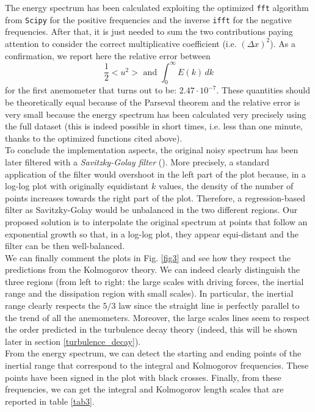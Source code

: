 \documentclass[11pt,titlepage]{article}
\begin{document}
The energy spectrum has been calculated exploiting the optimized \texttt{fft} algorithm from \texttt{Scipy} for the positive frequencies and the inverse \texttt{ifft} for the negative frequencies. After that, it is just needed to sum the two contributions paying attention to consider the correct multiplicative coefficient (i.e. $(\Delta x)^2$). As a confirmation, we report here the relative error between
\begin{equation*}
	\frac{1}{2}<u^2> \text{ and } \int_0^\infty E(k)\, dk
\end{equation*}
for the first anemometer that turns out to be: $2.47 \cdot 10^{-7}$. These quantities should be theoretically equal because of the Parseval theorem and the relative error is very small because the energy spectrum has been calculated very precisely using the full dataset (this is indeed possible in short times, i.e. less than one minute, thanks to the optimized functions cited above). \\
To conclude the implementation aspects, the original noisy spectrum has been later filtered with a \emph{Savitzky-Golay filter} (\cite{savgol}). More precisely, a standard application of the filter would overshoot in the left part of the plot because, in a log-log plot with originally equidistant $k$ values, the density of the number of points increases towards the right part of the plot. Therefore, a regression-based filter as Savitzky-Golay would be unbalanced in the two different regions. Our proposed solution is to interpolate the original spectrum at points that follow an exponential growth so that, in a log-log plot, they appear equi-distant and the filter can be then well-balanced. \\
We can finally comment the plots in Fig. \ref{fig3} and see how they respect the predictions from the Kolmogorov theory. We can indeed clearly distinguish the three regions (from left to right: the large scales with driving forces, the inertial range and the dissipation region with small scales). In particular, the inertial range clearly respects the $5/3$ law since the straight line is perfectly parallel to the trend of all the anemometers. Moreover, the large scales lines seem to respect the order predicted in the turbulence decay theory (indeed, this will be shown later in section \ref{turbulence_decay}). \\
From the energy spectrum, we can detect the starting and ending points of the inertial range that correspond to the integral and Kolmogorov frequencies. These points have been signed in the plot with black crosses. Finally, from these frequencies, we can get the integral and Kolmogorov length scales that are reported in table \ref{tab3}. \\
\end{document}
